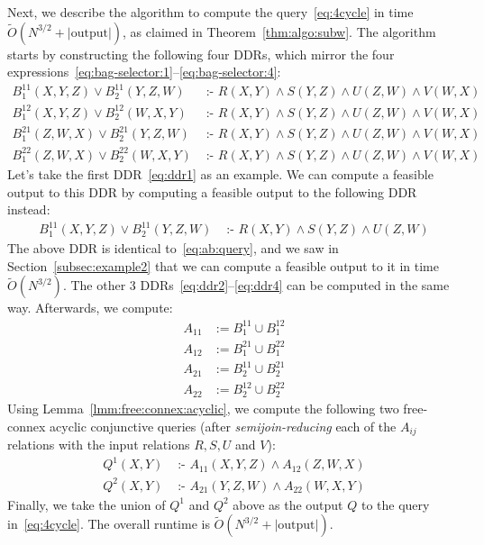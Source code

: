 \documentclass[10pt,a4paper]{article}
\newcommand{\cd}{\text{ :- }}
\begin{document}
    Next, we describe the algorithm to compute the query~\eqref{eq:4cycle} in time
    $\tilde O(N^{3/2} + |\text{output}|)$, as claimed in Theorem~\ref{thm:algo:subw}.
    The algorithm starts by constructing the following four DDRs, which mirror the four
    expressions~\eqref{eq:bag-selector:1}--\eqref{eq:bag-selector:4}:
    \begin{align}
        B_1^{11}(X,Y,Z) \vee B_2^{11}(Y,Z,W) & \cd
            R(X,Y) \wedge S(Y,Z) \wedge U(Z,W) \wedge V(W,X) \label{eq:ddr1}\\
        B_1^{12}(X,Y,Z) \vee B_2^{12}(W,X,Y) & \cd
            R(X,Y) \wedge S(Y,Z) \wedge U(Z,W) \wedge V(W,X) \label{eq:ddr2}\\
        B_1^{21}(Z,W,X) \vee B_2^{21}(Y,Z,W) & \cd
            R(X,Y) \wedge S(Y,Z) \wedge U(Z,W) \wedge V(W,X) \label{eq:ddr3}\\
        B_1^{22}(Z,W,X) \vee B_2^{22}(W,X,Y) & \cd
            R(X,Y) \wedge S(Y,Z) \wedge U(Z,W) \wedge V(W,X) \label{eq:ddr4}
    \end{align}
    Let's take the first DDR~\eqref{eq:ddr1} as an example. We can compute a feasible output
    to this DDR by computing a feasible output to the following DDR instead:
    \begin{align*}
        B_1^{11}(X,Y,Z) \vee B_2^{11}(Y,Z,W) & \cd
            R(X,Y) \wedge S(Y,Z) \wedge U(Z,W)
    \end{align*}
    The above DDR is identical to~\eqref{eq:ab:query}, and we saw in Section~\ref{subsec:example2} that we can compute a feasible output to it in time $\tilde O(N^{3/2})$.
    The other 3 DDRs~\eqref{eq:ddr2}--\eqref{eq:ddr4} can be computed in the same way.
    Afterwards, we compute:
    \begin{align*}
        A_{11} & := B_1^{11} \cup B_1^{12} \\
        A_{12} & := B_1^{21} \cup B_1^{22} \\
        A_{21} & := B_2^{11} \cup B_2^{21} \\
        A_{22} & := B_2^{12} \cup B_2^{22}
    \end{align*}
    Using Lemma~\eqref{lmm:free:connex:acyclic}, we compute the following two free-connex acyclic conjunctive queries
    (after {\em semijoin-reducing} each of the $A_{ij}$ relations with the input relations $R, S, U$ and $V$):
    \begin{align*}
        Q^1(X, Y) & \cd A_{11}(X, Y, Z) \wedge A_{12}(Z, W, X) \\
        Q^2(X, Y) & \cd A_{21}(Y, Z, W) \wedge A_{22}(W, X, Y)
    \end{align*}
    Finally, we take the union of $Q^1$ and $Q^2$ above as the output $Q$ to the query in~\eqref{eq:4cycle}. The overall runtime is $\tilde O(N^{3/2} + |\text{output}|)$.
\end{document}
